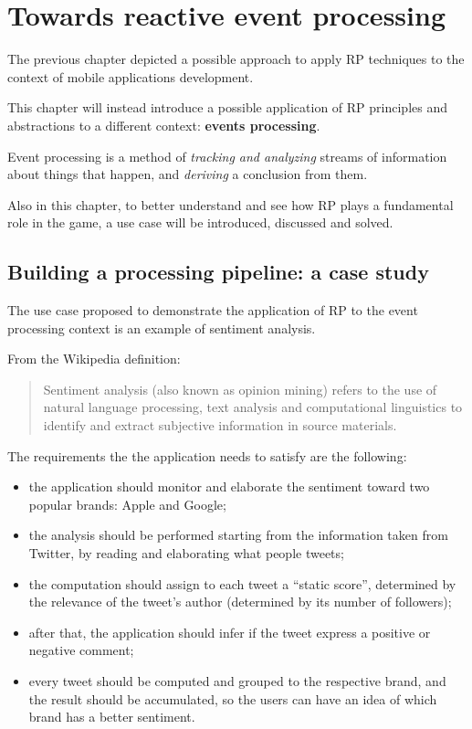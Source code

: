 \chapter{Towards reactive event
processing}\label{towards-reactive-event-processing}

The previous chapter depicted a possible approach to apply RP techniques
to the context of mobile applications development.

This chapter will instead introduce a possible application of RP
principles and abstractions to a different context: \textbf{events
processing}.

Event processing is a method of \emph{tracking and analyzing} streams of
information about things that happen, and \emph{deriving} a conclusion
from them.

Also in this chapter, to better understand and see how RP plays a
fundamental role in the game, a use case will be introduced, discussed
and solved.

\section{Building a processing pipeline: a case
study}\label{building-a-processing-pipeline-a-case-study}

The use case proposed to demonstrate the application of RP to the event
processing context is an example of sentiment analysis.

From the Wikipedia definition:

\begin{quote}
Sentiment analysis (also known as opinion mining) refers to the use of
natural language processing, text analysis and computational linguistics
to identify and extract subjective information in source materials.
\end{quote}

The requirements the the application needs to satisfy are the following:

\begin{itemize}
\itemsep1pt\parskip0pt
\item
  the application should monitor and elaborate the sentiment toward two
  popular brands: Apple and Google;
\item
  the analysis should be performed starting from the information taken
  from Twitter, by reading and elaborating what people tweets;
\item
  the computation should assign to each tweet a ``static score'',
  determined by the relevance of the tweet's author (determined by its
  number of followers);
\item
  after that, the application should infer if the tweet express a
  positive or negative comment;
\item
  every tweet should be computed and grouped to the respective brand,
  and the result should be accumulated, so the users can have an idea of
  which brand has a better sentiment.
\end{itemize}


